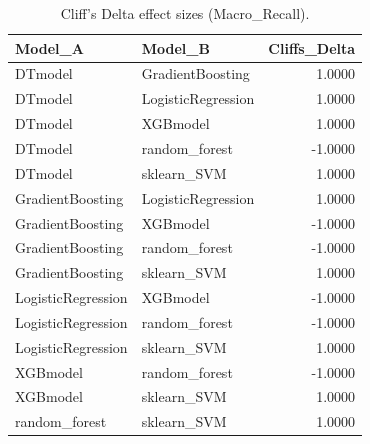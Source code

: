 \begin{table}[t]
\centering
\begin{tabular}{llr}
\toprule
Model_A & Model_B & Cliffs_Delta \\
\midrule
DTmodel & GradientBoosting & 1.0000 \\
DTmodel & LogisticRegression & 1.0000 \\
DTmodel & XGBmodel & 1.0000 \\
DTmodel & random_forest & -1.0000 \\
DTmodel & sklearn_SVM & 1.0000 \\
GradientBoosting & LogisticRegression & 1.0000 \\
GradientBoosting & XGBmodel & -1.0000 \\
GradientBoosting & random_forest & -1.0000 \\
GradientBoosting & sklearn_SVM & 1.0000 \\
LogisticRegression & XGBmodel & -1.0000 \\
LogisticRegression & random_forest & -1.0000 \\
LogisticRegression & sklearn_SVM & 1.0000 \\
XGBmodel & random_forest & -1.0000 \\
XGBmodel & sklearn_SVM & 1.0000 \\
random_forest & sklearn_SVM & 1.0000 \\
\bottomrule
\end{tabular}
\caption{Cliff's Delta effect sizes (Macro_Recall).}
\label{tab:cliffs_Macro_Recall}
\end{table}